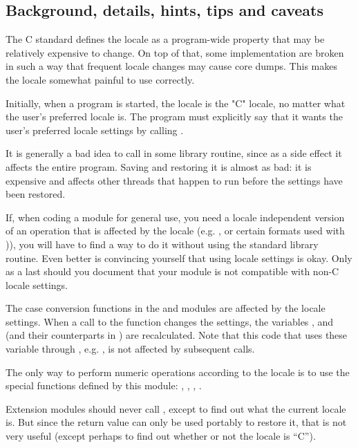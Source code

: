 \subsection{Background, details, hints, tips and caveats}

The C standard defines the locale as a program-wide property that may
be relatively expensive to change.  On top of that, some
implementation are broken in such a way that frequent locale changes
may cause core dumps.  This makes the locale somewhat painful to use
correctly.

Initially, when a program is started, the locale is the "C" locale, no
matter what the user's preferred locale is.  The program must
explicitly say that it wants the user's preferred locale settings by
calling .

It is generally a bad idea to call  in some library
routine, since as a side effect it affects the entire program.  Saving
and restoring it is almost as bad: it is expensive and affects other
threads that happen to run before the settings have been restored.

If, when coding a module for general use, you need a locale
independent version of an operation that is affected by the locale
(e.g. , or certain formats used with
)), you will have to find a way to do it without
using the standard library routine.  Even better is convincing
yourself that using locale settings is okay.  Only as a last should
you document that your module is not compatible with non-C locale
settings.

The case conversion functions in the  and 
modules are affected by the locale settings.  When a call to the
 function changes the  settings, the
variables ,  and
 (and their counterparts in ) are
recalculated.  Note that this code that uses these variable through
, e.g. , is
not affected by subsequent  calls.

The only way to perform numeric operations according to the locale
is to use the special functions defined by this module:
, , , .


Extension modules should never call , except to find
out what the current locale is.  But since the return value can only
be used portably to restore it, that is not very useful (except
perhaps to find out whether or not the locale is ``C'').

